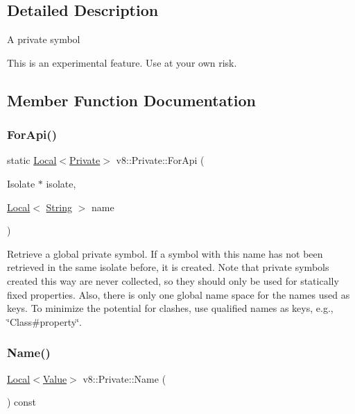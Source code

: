 \subsection{Detailed Description}
A private symbol

This is an experimental feature. Use at your own risk. 

\subsection{Member Function Documentation}
\mbox{\label{classv8_1_1Private_a0ab8628387166b8a8abc6e9b6f40ad55}} 
\subsubsection{\texorpdfstring{For\+Api()}{ForApi()}}
{\footnotesize\ttfamily static \mbox{\hyperlink{classv8_1_1Local}{Local}}$<$\mbox{\hyperlink{classv8_1_1Private}{Private}}$>$ v8\+::\+Private\+::\+For\+Api (\begin{DoxyParamCaption}\item[{Isolate $\ast$}]{isolate,  }\item[{\mbox{\hyperlink{classv8_1_1Local}{Local}}$<$ \mbox{\hyperlink{classv8_1_1String}{String}} $>$}]{name }\end{DoxyParamCaption})\hspace{0.3cm}{\ttfamily [static]}}

Retrieve a global private symbol. If a symbol with this name has not been retrieved in the same isolate before, it is created. Note that private symbols created this way are never collected, so they should only be used for statically fixed properties. Also, there is only one global name space for the names used as keys. To minimize the potential for clashes, use qualified names as keys, e.\+g., \char`\"{}\+Class\#property\char`\"{}. \mbox{\label{classv8_1_1Private_ab3bbd6a2dcf6aea73f65c95f0d216f12}} 
\subsubsection{\texorpdfstring{Name()}{Name()}}
{\footnotesize\ttfamily \mbox{\hyperlink{classv8_1_1Local}{Local}}$<$\mbox{\hyperlink{classv8_1_1Value}{Value}}$>$ v8\+::\+Private\+::\+Name (\begin{DoxyParamCaption}{ }\end{DoxyParamCaption}) const}

